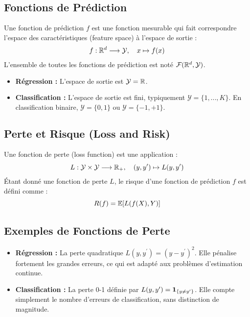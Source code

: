 \subsection{Fonctions de Prédiction}

\begin{definition}
Une fonction de prédiction $f$ est une fonction mesurable qui fait correspondre l'espace des caractéristiques (feature space) à l'espace de sortie :
\begin{equation}
f:\mathbb{R}^d\longrightarrow\mathcal{Y}, \quad x\mapsto f(x)
\end{equation}
L'ensemble de toutes les fonctions de prédiction est noté $\mathcal{F}(\mathbb{R}^d,\mathcal{Y})$.
\end{definition}

\begin{itemize}
    \item \textbf{Régression :} L'espace de sortie est $\mathcal{Y}=\mathbb{R}$.
    \item \textbf{Classification :} L'espace de sortie est fini, typiquement $\mathcal{Y}=\{1,...,K\}$. En classification binaire, $\mathcal{Y}=\{0,1\}$ ou $\mathcal{Y}=\{-1,+1\}$.
\end{itemize}

\subsection{Perte et Risque (Loss and Risk)}

\begin{definition}
Une fonction de perte (loss function) est une application :
\begin{equation}
L:\mathcal{Y}\times\mathcal{Y}\longrightarrow\mathbb{R}_{+}, \quad (y,y^{\prime})\mapsto L(y,y^{\prime})
\end{equation}
Étant donné une fonction de perte $L$, le risque d'une fonction de prédiction $f$ est défini comme :
\begin{equation}
R(f) = \mathbb{E}[L(f(X),Y)]
\end{equation}
\end{definition}

\subsection{Exemples de Fonctions de Perte}

\begin{exemple}
\begin{itemize}
    \item \textbf{Régression :} La perte quadratique $L(y,y^{\prime})=(y-y^{\prime})^{2}$. Elle pénalise fortement les grandes erreurs, ce qui est adapté aux problèmes d'estimation continue.
    \item \textbf{Classification :} La perte 0-1 définie par $L(y,y^{\prime})=\mathbf{1}_{\{y\ne y^{\prime}\}}$. Elle compte simplement le nombre d'erreurs de classification, sans distinction de magnitude.
\end{itemize}
\end{exemple}

